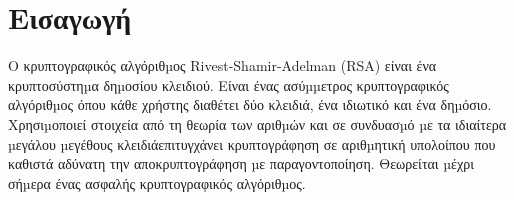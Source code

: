 %
%
\section*{Εισαγωγή}
\noindent
Ο κρυπτογραφικός αλγόριθµος Rivest-Shamir-Adelman (RSA) είναι ένα κρυπτοσύστηµα δηµοσίου κλειδιού. 
Είναι ένας ασύµµετρος κρυπτογραφικός αλγόριθµος όπου κάθε χρήστης διαθέτει δύο κλειδιά, ένα ιδιωτικό 
και ένα δηµόσιο. Χρησιµοποιεί στοιχεία από τη θεωρία των αριθµών και σε συνδυασµό µε τα ιδιαίτερα 
µεγάλου µεγέθους κλειδιάεπιτυγχάνει κρυπτογράφηση σε αριθµητική υπολοίπου που καθιστά αδύνατη 
την αποκρυπτογράφηση µε παραγοντοποίηση. Θεωρείται µέχρι σήµερα ένας ασφαλής κρυπτογραφικός αλγόριθµος.

